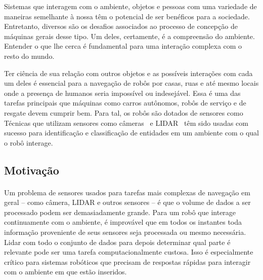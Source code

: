 \documentclass[11pt]{article}
\begin{document}
Sistemas que interagem com o ambiente, objetos e pessoas 
com uma variedade de maneiras semelhante à nossa têm o potencial de ser 
benéficos para a sociedade. 
Entretanto, diversos são os desafios associados ao processo de concepção de 
máquinas gerais desse tipo. 
Um deles, certamente, é a compreensão do ambiente. 
Entender o que lhe cerca é fundamental para uma interação complexa com o resto
do mundo. 

Ter ciência de sua relação com outros objetos e 
as possíveis interações com cada um deles é essencial para a navegação 
de robôs por casas, ruas e até mesmo locais onde a presença de humanos seria 
impossível ou indesejável.
Essa é uma das tarefas principais que máquinas como carros autônomos, 
robôs de serviço \cite{ifr} e de resgate devem cumprir bem. 
Para tal, os robôs são dotados de sensores como
Técnicas que utilizam sensores como câmeras~\cite{vision} e LIDAR~\cite{car} 
têm sido usadas com sucesso para identificação e classificação de entidades 
em um ambiente com o qual o robô interage. 

\subsection{Motivação}
\paragraph{}
Um problema de sensores usados para tarefas mais complexas de navegação
em geral -- como câmera, LIDAR e outros sensores --
é que o volume de dados a ser processado podem ser demasiadamente grande. 
Para um robô que interage continuamente com o ambiente, é improvável que em 
todos os instantes  toda informação proveniente de seus sensores seja 
processada ou mesmo necessária. 
Lidar com todo o conjunto de dados para depois determinar qual parte é 
relevante pode ser uma tarefa  computacionalmente custosa. 
Isso é especialmente crítico para sistemas robóticos que precisam de respostas
rápidas para interagir com o ambiente em que estão inseridos. 
\end{document}
